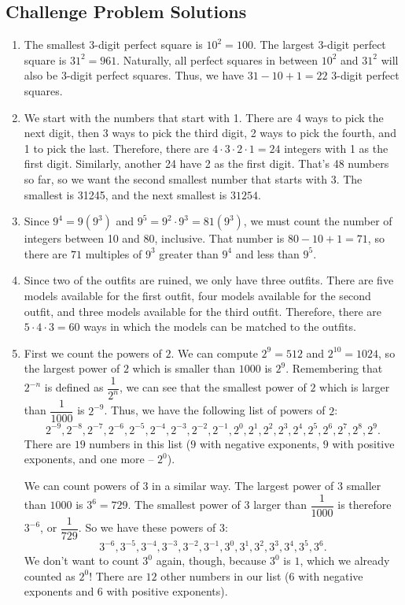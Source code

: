 \documentclass[12pt, letterpaper]{article}
\begin{document}
\newpage
\subsection{Challenge Problem Solutions}

\begin{enumerate}
    \item The smallest 3-digit perfect square is $10^2=100$. The largest 3-digit perfect square is $31^2=961$. Naturally, all perfect squares in between $10^2$ and $31^2$ will also be 3-digit perfect squares. Thus, we have $31-10+1 = \boxed{22}$ 3-digit perfect squares.
    \item We start with the numbers that start with 1. There are 4 ways to pick the next digit, then 3 ways to pick the third digit, 2 ways to pick the fourth, and 1 to pick the last. Therefore, there are $4\cdot 3\cdot 2\cdot 1=24$ integers with 1 as the first digit. Similarly, another 24 have 2 as the first digit. That's 48 numbers so far, so we want the second smallest number that starts with 3. The smallest is 31245, and the next smallest is $\boxed{31254}$.
    \item Since $9^4=9(9^3)$ and $9^5=9^2\cdot9^3=81(9^3)$, we must count the number of integers between 10 and 80, inclusive. That number is $80-10+1=71$, so there are $\boxed{71}$ multiples of $9^3$ greater than $9^4$ and less than $9^5$.
    \item Since two of the outfits are ruined, we only have three outfits. There are five models available for the first outfit, four models available for the second outfit, and three models available for the third outfit. Therefore, there are $5 \cdot 4 \cdot 3 = \boxed{60}$ ways in which the models can be matched to the outfits.
    \item First we count the powers of $2$. We can compute $2^9=512$ and $2^{10}=1024$, so the largest power of $2$ which is smaller than $1000$ is $2^9$. Remembering that $2^{-n}$ is defined as $\dfrac{1}{2^n}$, we can see that the smallest power of $2$ which is larger than $\dfrac{1}{1000}$ is $2^{-9}$. Thus, we have the following list of powers of $2$:
    $$2^{-9}, 2^{-8}, 2^{-7}, 2^{-6}, 2^{-5}, 2^{-4}, 2^{-3}, 2^{-2}, 2^{-1}, 2^0, 2^1, 2^2, 2^3, 2^4, 2^5, 2^6, 2^7, 2^8, 2^9.$$
    There are $19$ numbers in this list ($9$ with negative exponents, $9$ with positive exponents, and one more -- $2^0$).

    We can count powers of $3$ in a similar way. The largest power of $3$ smaller than $1000$ is $3^6 = 729$. The smallest power of $3$ larger than $\dfrac{1}{1000}$ is therefore $3^{-6}$, or $\dfrac{1}{729}$. So we have these powers of $3$: $$3^{-6}, 3^{-5}, 3^{-4}, 3^{-3}, 3^{-2}, 3^{-1}, 3^0, 3^1, 3^2, 3^3, 3^4, 3^5, 3^6.$$ We don't want to count $3^0$ again, though, because $3^0$ is $1$, which we already counted as $2^0$! There are $12$ other numbers in our list ($6$ with negative exponents and $6$ with positive exponents).
    

\end{enumerate}
\end{document}
